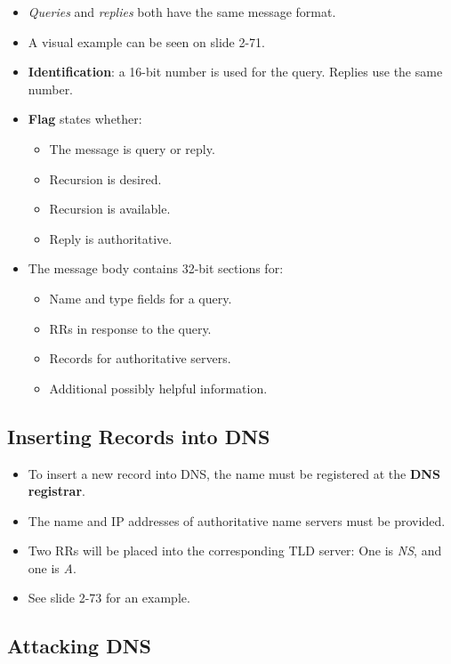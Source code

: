\documentclass{article}
\begin{document}
\begin{itemize}
\item {\it Queries} and {\it replies} both have the same message format.
\item A visual example can be seen on slide 2-71.
\item {\bf Identification}: a 16-bit number is used for the query. Replies use the same number.
\item {\bf Flag} states whether:
\begin{itemize}
\item The message is query or reply.
\item Recursion is desired.
\item Recursion is available.
\item Reply is authoritative.
\end{itemize}
\item The message body contains 32-bit sections for:
\begin{itemize}
\item Name and type fields for a query.
\item RRs in response to the query.
\item Records for authoritative servers.
\item Additional possibly helpful information.
\end{itemize}
\end{itemize}

\clearpage

\subsection{Inserting Records into DNS}

\begin{itemize}
\item To insert a new record into DNS, the name must be registered at the {\bf DNS registrar}.
\item The name and IP addresses of authoritative name servers must be provided.
\item Two RRs will be placed into the corresponding TLD server: One is {\it NS}, and one is {\it A}.
\item See slide 2-73 for an example.
\end{itemize}

\subsection{Attacking DNS}
\end{document}
